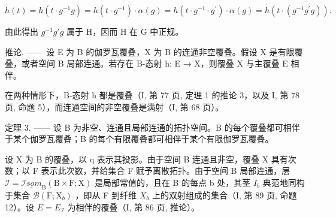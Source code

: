 \[
h (t) = h \left(t \cdot g ^ {- 1} g\right) = h \left(t \cdot g ^ {- 1}\right) \cdot \alpha (g) = h \left(t \cdot g ^ {- 1} \cdot g ^ {\prime}\right) \cdot \alpha (g) = h \left(t \cdot \left(g ^ {- 1} g ^ {\prime} g\right)\right).
\]

由此得出 \(g^{-1}g'g\) 属于 H，因而 H 在 G 中正规。

推论. —— 设 E 为 B 的伽罗瓦覆叠，X 为 B 的连通非空覆叠。假设 X 是有限覆叠，或者空间 B 局部连通。若存在 B-态射 h: E → X，则覆叠 X 与主覆叠 E 相伴。

在两种情形下，B-态射 h 都是覆叠（I, 第 77 页, 定理 1 的推论 3，以及 I, 第 78 页, 命题 5），而连通空间的非空覆叠是满射（I, 第 68 页）。

定理 3. —— 设 B 为非空、连通且局部连通的拓扑空间。B 的每个覆叠都可相伴于某个伽罗瓦覆叠；B 的每个有限覆叠都可相伴于某个有限伽罗瓦覆叠。

设 X 为 B 的覆叠，以 q 表示其投影。由于空间 B 连通且非空，覆叠 X 具有次数；以 F 表示此次数，并给集合 F 赋予离散拓扑。由于空间 B 局部连通，层 \(\mathcal{I} = \underline{\mathcal{I}som}_{\mathrm{B}}(\mathrm{B} \times \mathrm{F}; \mathrm{X})\) 是局部常值的，且在 B 的每点 b 处，其茎 \(I_{b}\) 典范地同构于集合 \(\mathcal{B}(\mathrm{F}; \mathrm{X}_{b})\) ，即从 F 到纤维 \(X_{b}\) 上的双射组成的集合（I, 第 89 页, 命题 12）。设 \(E = E_{\mathcal{I}}\) 为相伴的覆叠（I, 第 86 页, 推论）。


